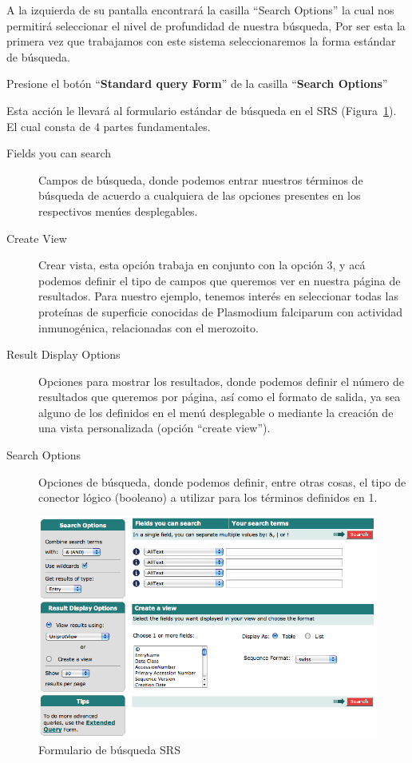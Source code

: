 \documentclass[letter,11pt]{book}
\begin{document}
A la izquierda de su pantalla encontrará la casilla ``Search Options'' la cual nos permitirá seleccionar el nivel de profundidad de nuestra búsqueda, Por ser esta la primera vez que trabajamos con este sistema seleccionaremos la forma estándar de búsqueda.

Presione el botón ``\textbf{Standard query Form}'' de la casilla ``\textbf{Search Options}''

Esta acción le llevará al formulario estándar de búsqueda en el SRS (Figura~\ref{searchform}). El cual consta de 4 partes fundamentales.

\begin{description}
\item[Fields you can search] Campos de búsqueda, donde podemos entrar nuestros términos de búsqueda de acuerdo a cualquiera de las opciones presentes en los respectivos menúes desplegables.
\item[Create View] Crear vista, esta opción trabaja en conjunto con la opción 3, y acá podemos definir el tipo de campos que queremos ver en nuestra página de resultados. Para nuestro ejemplo, tenemos interés en seleccionar todas las proteínas de superficie conocidas de Plasmodium falciparum con actividad inmunogénica, relacionadas con el merozoito.
\item[Result Display Options] Opciones para mostrar los resultados, donde podemos definir el número de resultados que queremos por página, así como el formato de salida, ya sea alguno de los definidos en el menú desplegable o mediante la creación de una vista personalizada (opción ``create view'').
\item[Search Options] Opciones de búsqueda, donde podemos definir, entre otras cosas, el tipo de conector lógico (booleano) a utilizar para los términos definidos en 1.
\end{description}


\begin{figure}[ht]
\centering
   \includegraphics[width=12cm]{Figs/SearchFormSRS.png}
  \caption{\label{searchform}Formulario de búsqueda SRS}
\end{figure}
\end{document}
